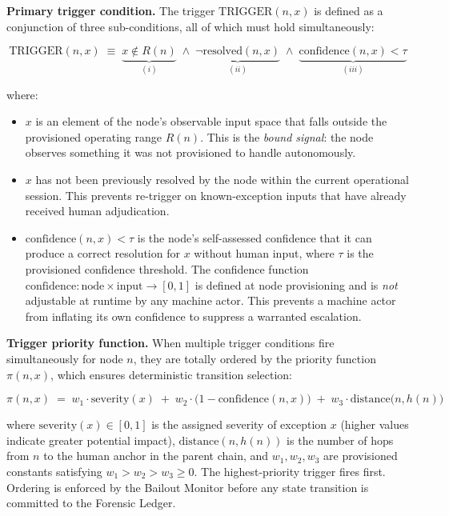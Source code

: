 \medskip
\noindent\textbf{Primary trigger condition.} The trigger $\text{TRIGGER}(n, x)$ is defined as a conjunction of three sub-conditions, all of which must hold simultaneously:

\begin{equation}
\text{TRIGGER}(n, x) \;\equiv\; \underbrace{x \notin R(n)}_{(i)} \;\land\; \underbrace{\neg\text{resolved}(n, x)}_{(ii)} \;\land\; \underbrace{\text{confidence}(n, x) < \tau}_{(iii)} \tag{TC}
\end{equation}

where:

\begin{itemize}\itemsep=0pt
\item[(i)] $x$ is an element of the node's observable input space that falls outside the provisioned operating range $R(n)$. This is the \emph{bound signal}: the node observes something it was not provisioned to handle autonomously.

\item[(ii)] $x$ has not been previously resolved by the node within the current operational session. This prevents re-trigger on known-exception inputs that have already received human adjudication.

\item[(iii)] $\text{confidence}(n, x) < \tau$ is the node's self-assessed confidence that it can produce a correct resolution for $x$ without human input, where $\tau$ is the provisioned confidence threshold. The confidence function $\text{confidence} : \text{node} \times \text{input} \rightarrow [0, 1]$ is defined at node provisioning and is \emph{not} adjustable at runtime by any machine actor. This prevents a machine actor from inflating its own confidence to suppress a warranted escalation.
\end{itemize}

\medskip
\noindent\textbf{Trigger priority function.} When multiple trigger conditions fire simultaneously for node $n$, they are totally ordered by the priority function $\pi(n, x)$, which ensures deterministic transition selection:

\begin{equation}
\pi(n, x) \;=\; w_1 \cdot \text{severity}(x) \;+\; w_2 \cdot \bigl(1 - \text{confidence}(n, x)\bigr) \;+\; w_3 \cdot \text{distance}\bigl(n, h(n)\bigr) \tag{PF}
\end{equation}

where $\text{severity}(x) \in [0, 1]$ is the assigned severity of exception $x$ (higher values indicate greater potential impact), $\text{distance}(n, h(n))$ is the number of hops from $n$ to the human anchor in the parent chain, and $w_1, w_2, w_3$ are provisioned constants satisfying $w_1 > w_2 > w_3 \geq 0$. The highest-priority trigger fires first. Ordering is enforced by the Bailout Monitor before any state transition is committed to the Forensic Ledger.

